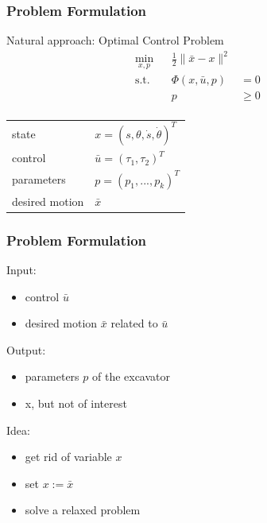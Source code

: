 \begin{frame}
    \frametitle{Problem Formulation}
    Natural approach: Optimal Control Problem
    \begin{align*}
        \min_{x,p} & & \frac{1}{2} \| \bar{x} - x \|^2 & & \\
        \operatorname{s.t.} & & \Phi(x,\bar{u},p) & = 0 & & \\
                            & & p & \geq 0 & & \\
    \end{align*}

    \begin{tabular}{ll}
        state & $ x = (s,\theta,\dot{s},\dot{\theta})^T $ \\
        control & $ \bar{u} = (\tau_1,\tau_2)^T $ \\
        parameters & $ p = (p_1,...,p_k)^T $ \\
        desired motion & $\bar{x}$ \\
    \end{tabular}
\end{frame}

\begin{frame}
    \frametitle{Problem Formulation}
    Input:
    \begin{itemize}
        \item{control $\bar{u}$}
        \item{desired motion $\bar{x}$ related to $\bar{u}$}
    \end{itemize}

    Output:
    \begin{itemize}
        \item{parameters $p$ of the excavator}
        \item{x, but not of interest}
    \end{itemize}

    Idea:
    \begin{itemize}
        \item{get rid of variable $x$}
        \item{set $x := \bar{x}$}
        \item{solve a relaxed problem}
    \end{itemize}
\end{frame}

